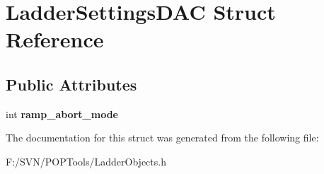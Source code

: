 \hypertarget{struct_ladder_settings_d_a_c}{\section{Ladder\-Settings\-D\-A\-C Struct Reference}
\label{struct_ladder_settings_d_a_c}
}
\subsection*{Public Attributes}
\begin{DoxyCompactItemize}
\item 
\hypertarget{struct_ladder_settings_d_a_c_ac6cf00e6f02c802f10ffe0095a983505}{int {\bfseries ramp\-\_\-abort\-\_\-mode}}\label{struct_ladder_settings_d_a_c_ac6cf00e6f02c802f10ffe0095a983505}

\end{DoxyCompactItemize}


The documentation for this struct was generated from the following file\-:\begin{DoxyCompactItemize}
\item 
F\-:/\-S\-V\-N/\-P\-O\-P\-Tools/Ladder\-Objects.\-h\end{DoxyCompactItemize}
